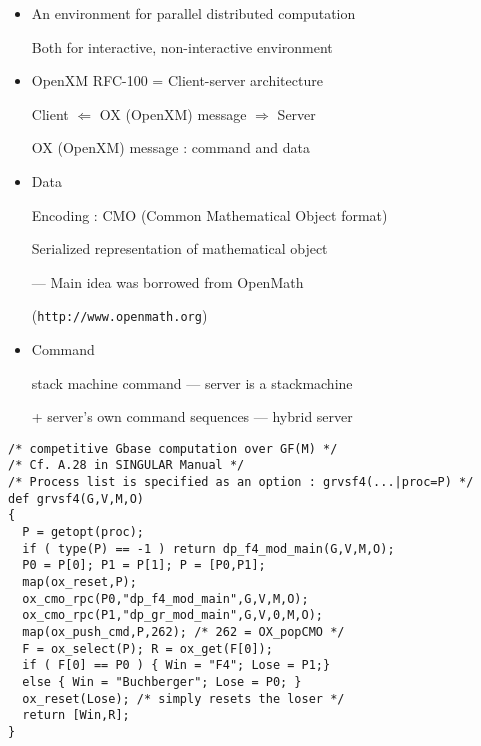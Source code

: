 \begin{slide}{}

\begin{itemize}
\item An environment for parallel distributed computation

Both for interactive, non-interactive environment

\item OpenXM RFC-100 = Client-server architecture

Client $\Leftarrow$ OX (OpenXM) message $\Rightarrow$ Server

OX (OpenXM) message : command and data

\item Data

Encoding : CMO (Common Mathematical Object format)

Serialized representation of mathematical object

--- Main idea was borrowed from OpenMath 

({\tt http://www.openmath.org})

\item Command

stack machine command --- server is a stackmachine

+ server's own command sequences --- hybrid server
\end{itemize}
\end{slide}

\begin{slide}{}

\begin{verbatim}
/* competitive Gbase computation over GF(M) */
/* Cf. A.28 in SINGULAR Manual */
/* Process list is specified as an option : grvsf4(...|proc=P) */
def grvsf4(G,V,M,O)
{
  P = getopt(proc);
  if ( type(P) == -1 ) return dp_f4_mod_main(G,V,M,O);
  P0 = P[0]; P1 = P[1]; P = [P0,P1];
  map(ox_reset,P);
  ox_cmo_rpc(P0,"dp_f4_mod_main",G,V,M,O);
  ox_cmo_rpc(P1,"dp_gr_mod_main",G,V,0,M,O);
  map(ox_push_cmd,P,262); /* 262 = OX_popCMO */
  F = ox_select(P); R = ox_get(F[0]);
  if ( F[0] == P0 ) { Win = "F4"; Lose = P1;}
  else { Win = "Buchberger"; Lose = P0; }
  ox_reset(Lose); /* simply resets the loser */
  return [Win,R];
}
\end{verbatim}
\end{slide}

